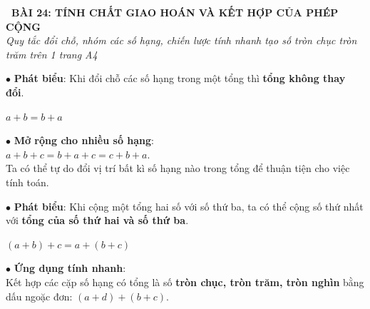 \documentclass[14pt,a4paper,oneside]{extbook}
\begin{document}
\noindent
\begin{tcolorbox}[
  enhanced,
  colback=teal!8!white,
  colframe=teal!80!black,
  arc=3mm, boxrule=1pt,
  left=3mm, right=3mm, top=2mm, bottom=2mm,
  halign=center
]
  {\Large\bfseries\color{teal!90!black}\faBookmark\ BÀI 24: TÍNH CHẤT GIAO HOÁN VÀ KẾT HỢP CỦA PHÉP CỘNG}\\[1.5pt]
  {\footnotesize\itshape\color{black!75} Quy tắc đổi chỗ, nhóm các số hạng, chiến lược tính nhanh tạo số tròn chục tròn trăm trên 1 trang A4}
\end{tcolorbox}

\vspace{2mm}

\noindent
\begin{minipage}[t]{0.49\textwidth}
  \begin{tcolorbox}[
    enhanced,
    title={\footnotesize\bfseries\color{white}\faRandom\ 1. Tính chất giao hoán},
    colback=blue!2!white,
    colframe=blue!75!black,
    arc=2.5mm, boxrule=0.8pt, top=1.8mm, bottom=1.8mm, left=2mm, right=2mm
  ]
    \footnotesize
    $\bullet$ \textbf{Phát biểu}: Khi đổi chỗ các số hạng trong một tổng thì \textbf{tổng không thay đổi}.
    \begin{center}
      \color{blue!85!black}\textbf{\Large $a + b = b + a$}
    \end{center}
    $\bullet$ \textbf{Mở rộng cho nhiều số hạng}:\\
    $a + b + c = b + a + c = c + b + a$.\\
    Ta có thể tự do đổi vị trí bất kì số hạng nào trong tổng để thuận tiện cho việc tính toán.
  \end{tcolorbox}
\end{minipage}%
\hfill
\begin{minipage}[t]{0.49\textwidth}
  \begin{tcolorbox}[
    enhanced,
    title={\footnotesize\bfseries\color{white}\faCompress\ 2. Tính chất kết hợp},
    colback=teal!2!white,
    colframe=teal!75!black,
    arc=2.5mm, boxrule=0.8pt, top=1.8mm, bottom=1.8mm, left=2mm, right=2mm
  ]
    \footnotesize
    $\bullet$ \textbf{Phát biểu}: Khi cộng một tổng hai số với số thứ ba, ta có thể cộng số thứ nhất với \textbf{tổng của số thứ hai và số thứ ba}.
    \begin{center}
      \color{teal!85!black}\textbf{\Large $(a + b) + c = a + (b + c)$}
    \end{center}
    $\bullet$ \textbf{Ứng dụng tính nhanh}:\\
    Kết hợp các cặp số hạng có tổng là số \textbf{tròn chục, tròn trăm, tròn nghìn} bằng dấu ngoặc đơn:
    $(a + d) + (b + c)$.
  \end{tcolorbox}
\end{minipage}
\end{document}
